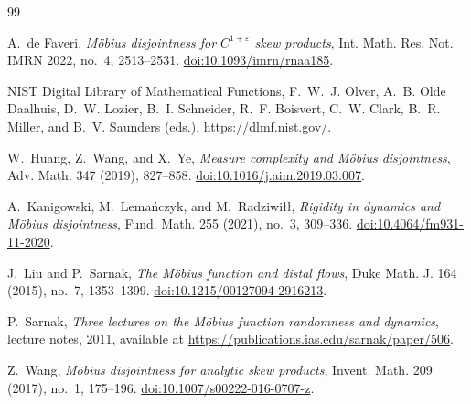 \documentclass[11pt,reqno]{amsart}
\theoremstyle{definition}
\begin{document}
\begin{thebibliography}{99}

A.~de Faveri,
\emph{M\"obius disjointness for $C^{1+\varepsilon}$ skew products},
Int. Math. Res. Not. IMRN 2022, no.~4, 2513--2531.
\href{https://doi.org/10.1093/imrn/rnaa185}{doi:10.1093/imrn/rnaa185}.

NIST Digital Library of Mathematical Functions,
F.~W.~J. Olver, A.~B. Olde Daalhuis, D.~W. Lozier, B.~I. Schneider, R.~F. Boisvert,
C.~W. Clark, B.~R. Miller, and B.~V. Saunders (eds.),
\url{https://dlmf.nist.gov/}.

W.~Huang, Z.~Wang, and X.~Ye,
\emph{Measure complexity and M\"obius disjointness},
Adv. Math. 347 (2019), 827--858.
\href{https://doi.org/10.1016/j.aim.2019.03.007}{doi:10.1016/j.aim.2019.03.007}.

A.~Kanigowski, M.~Lema\'nczyk, and M.~Radziwi\l\l,
\emph{Rigidity in dynamics and M\"obius disjointness},
Fund. Math. 255 (2021), no.~3, 309--336.
\href{https://doi.org/10.4064/fm931-11-2020}{doi:10.4064/fm931-11-2020}.

J.~Liu and P.~Sarnak,
\emph{The M\"obius function and distal flows},
Duke Math. J. 164 (2015), no.~7, 1353--1399.
\href{https://doi.org/10.1215/00127094-2916213}{doi:10.1215/00127094-2916213}.

P.~Sarnak,
\emph{Three lectures on the M\"obius function randomness and dynamics},
lecture notes, 2011, available at \url{https://publications.ias.edu/sarnak/paper/506}.

Z.~Wang,
\emph{M\"obius disjointness for analytic skew products},
Invent. Math. 209 (2017), no.~1, 175--196.
\href{https://doi.org/10.1007/s00222-016-0707-z}{doi:10.1007/s00222-016-0707-z}.

\end{thebibliography}
\end{document}
